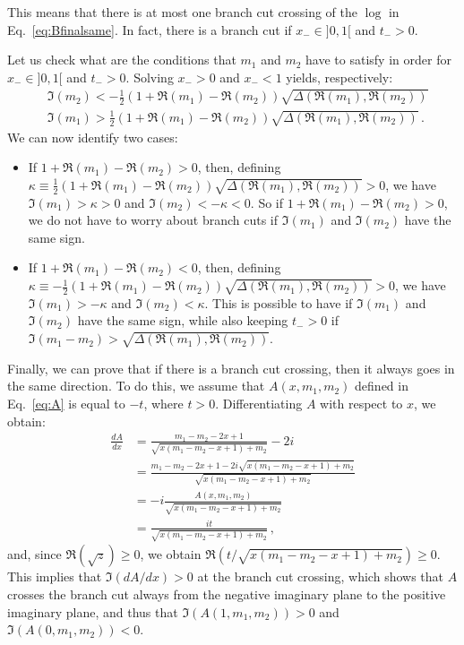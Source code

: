 \documentclass[twoside]{article}
\begin{document}
This means that there is at most one branch cut crossing of the $\log$ in Eq.~\eqref{eq:Bfinalsame}. In fact, there is a branch cut if $x_- \in ]0,1[$ and $t_- > 0$.

Let us check what are the conditions that $m_1$ and $m_2$ have to satisfy in order for $x_- \in ]0,1[$ and $t_- > 0$. Solving $x_- > 0$ and $x_- < 1$ yields, respectively:
\begin{align}
\label{eq:im2}
& \Im(m_2) < -\frac{1}{2} (1 + \Re(m_1) - \Re(m_2)) \sqrt{\Delta(\Re(m_1), \Re(m_2))} \\
\label{eq:im1}
& \Im(m_1) > \frac{1}{2} (1 + \Re(m_1) - \Re(m_2)) \sqrt{\Delta(\Re(m_1), \Re(m_2))}\,.
\end{align}
We can now identify two cases:
\begin{itemize}
\item If $1 + \Re(m_1) - \Re(m_2)> 0$, then, defining $\kappa \equiv \frac{1}{2} (1 + \Re(m_1) - \Re(m_2)) \sqrt{\Delta(\Re(m_1), \Re(m_2))} >0$, we have $\Im(m_1) > \kappa > 0$ and $\Im(m_2) < -\kappa < 0$. So if $1 + \Re(m_1) - \Re(m_2)> 0$, we do not have to worry about branch cuts if $\Im(m_1)$ and $\Im(m_2)$ have the same sign.

\item If $1 + \Re(m_1) - \Re(m_2) < 0$, then, defining $\kappa \equiv -\frac{1}{2} (1 + \Re(m_1) - \Re(m_2)) \sqrt{\Delta(\Re(m_1), \Re(m_2))} >0$, we have $\Im(m_1) > -\kappa$ and $\Im(m_2) < \kappa$. This is possible to have if $\Im(m_1)$ and $\Im(m_2)$ have the same sign, while also keeping $t_- >0$ if $\Im(m_1 - m_2) > \sqrt{\Delta(\Re(m_1), \Re(m_2))}$.
\end{itemize}


Finally, we can prove that if there is a branch cut crossing, then it always goes in the same direction.
To do this, we assume that $A(x, m_1, m_2)$ defined in Eq.~\eqref{eq:A} is equal to $-t$, where $t>0$. Differentiating $A$ with respect to $x$, we obtain:
\begin{equation}
\begin{split}
\frac{dA}{dx} & = \frac{m_1-m_2-2 x+1}{\sqrt{x (m_1-m_2-x+1)+m_2}}-2 i \\
& = \frac{m_1-m_2-2 x+1 - 2 i \sqrt{x (m_1-m_2-x+1)+m_2}}{\sqrt{x (m_1-m_2-x+1)+m_2}} \\
& = -i \frac{A(x, m_1, m_2)}{\sqrt{x (m_1-m_2-x+1)+m_2}} \\
& =  \frac{i t}{\sqrt{x (m_1-m_2-x+1)+m_2}}\,,
\end{split}
\end{equation}
and, since $\Re(\sqrt{z}) \geq 0$, we obtain $\Re(t/\sqrt{x (m_1-m_2-x+1)+m_2}) \geq 0$. This implies that $\Im(dA/dx) > 0$ at the branch cut crossing, which shows that $A$ crosses the branch cut always from the negative imaginary plane to the positive imaginary plane, and thus that $\Im(A(1,m_1,m_2)) > 0$ and $\Im(A(0,m_1,m_2)) < 0$.
\end{document}
